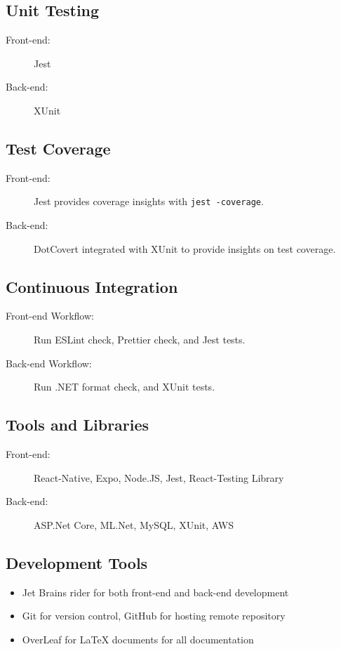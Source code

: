 \documentclass{article}
\begin{document}
	\subsection{Unit Testing}
	\begin{description}
		\item[Front-end:] Jest
		\item[Back-end:] XUnit
	\end{description}

	\subsection{Test Coverage}
	\begin{description}
		\item[Front-end:] Jest provides coverage insights with \texttt{jest -coverage}.
		\item[Back-end:] DotCovert integrated with XUnit to provide insights on test coverage.
	\end{description}

	\subsection{Continuous Integration}
	\begin{description}
		\item[Front-end Workflow:] Run ESLint check, Prettier check, and Jest tests.
		\item[Back-end Workflow:] Run .NET format check, and XUnit tests.
	\end{description}

	\subsection{Tools and Libraries}
	\begin{description}
		\item[Front-end:] React-Native, Expo, Node.JS, Jest, React-Testing Library
		\item[Back-end:] ASP.Net Core, ML.Net, MySQL, XUnit, AWS
	\end{description}

	\subsection{Development Tools}
	\begin{itemize}
		\item Jet Brains rider for both front-end and back-end development
		\item Git for version control, GitHub for hosting remote repository
		\item OverLeaf for LaTeX documents for all documentation
	\end{itemize}
\end{document}
